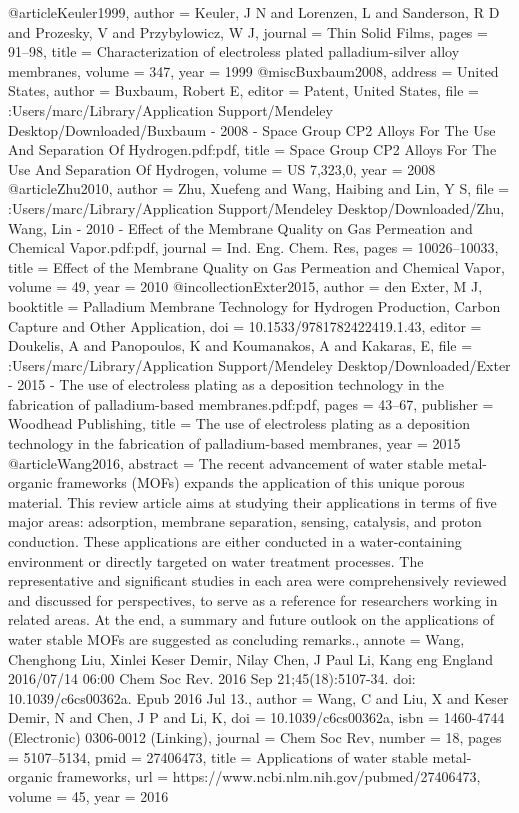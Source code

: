 @article{Keuler1999,
author = {Keuler, J N and Lorenzen, L and Sanderson, R D and Prozesky, V and Przybylowicz, W J},
journal = {Thin Solid Films},
pages = {91--98},
title = {{Characterization of electroless plated palladium-silver alloy membranes}},
volume = {347},
year = {1999}
}
@misc{Buxbaum2008,
address = {United States},
author = {Buxbaum, Robert E},
editor = {Patent, United States},
file = {:Users/marc/Library/Application Support/Mendeley Desktop/Downloaded/Buxbaum - 2008 - Space Group CP2 Alloys For The Use And Separation Of Hydrogen.pdf:pdf},
title = {{Space Group CP2 Alloys For The Use And Separation Of Hydrogen}},
volume = {US 7,323,0},
year = {2008}
}
@article{Zhu2010,
author = {Zhu, Xuefeng and Wang, Haibing and Lin, Y S},
file = {:Users/marc/Library/Application Support/Mendeley Desktop/Downloaded/Zhu, Wang, Lin - 2010 - Effect of the Membrane Quality on Gas Permeation and Chemical Vapor.pdf:pdf},
journal = {Ind. Eng. Chem. Res},
pages = {10026--10033},
title = {{Effect of the Membrane Quality on Gas Permeation and Chemical Vapor}},
volume = {49},
year = {2010}
}
@incollection{Exter2015,
author = {den Exter, M J},
booktitle = {Palladium Membrane Technology for Hydrogen Production, Carbon Capture and Other Application},
doi = {10.1533/9781782422419.1.43},
editor = {Doukelis, A and Panopoulos, K and Koumanakos, A and Kakaras, E},
file = {:Users/marc/Library/Application Support/Mendeley Desktop/Downloaded/Exter - 2015 - The use of electroless plating as a deposition technology in the fabrication of palladium-based membranes.pdf:pdf},
pages = {43--67},
publisher = {Woodhead Publishing},
title = {{The use of electroless plating as a deposition technology in the fabrication of palladium-based membranes}},
year = {2015}
}
@article{Wang2016,
abstract = {The recent advancement of water stable metal-organic frameworks (MOFs) expands the application of this unique porous material. This review article aims at studying their applications in terms of five major areas: adsorption, membrane separation, sensing, catalysis, and proton conduction. These applications are either conducted in a water-containing environment or directly targeted on water treatment processes. The representative and significant studies in each area were comprehensively reviewed and discussed for perspectives, to serve as a reference for researchers working in related areas. At the end, a summary and future outlook on the applications of water stable MOFs are suggested as concluding remarks.},
annote = {Wang, Chenghong
Liu, Xinlei
Keser Demir, Nilay
Chen, J Paul
Li, Kang
eng
England
2016/07/14 06:00
Chem Soc Rev. 2016 Sep 21;45(18):5107-34. doi: 10.1039/c6cs00362a. Epub 2016 Jul 13.},
author = {Wang, C and Liu, X and {Keser Demir}, N and Chen, J P and Li, K},
doi = {10.1039/c6cs00362a},
isbn = {1460-4744 (Electronic)
0306-0012 (Linking)},
journal = {Chem Soc Rev},
number = {18},
pages = {5107--5134},
pmid = {27406473},
title = {{Applications of water stable metal-organic frameworks}},
url = {https://www.ncbi.nlm.nih.gov/pubmed/27406473},
volume = {45},
year = {2016}
}
